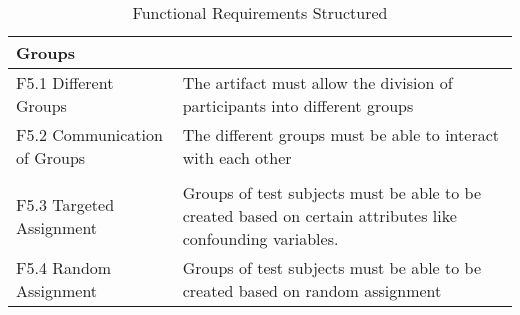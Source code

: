 \begin{table}
\begin{tabular}{L{0.35\textwidth}L{0.59\textwidth}}
    Groups                      &             \\ \hline
    F5.1 Different Groups           & The artifact must allow the division of participants into different groups            \\
    F5.2 Communication of Groups    & The different groups must be able to interact with each other            \\ 
    & \\
    F5.3 Targeted Assignment        & Groups of test subjects must be able to be created based on certain attributes like confounding variables. \\
    F5.4 Random Assignment          & Groups of test subjects must be able to be created based on random assignment \\ \hline
    \end{tabular}
    \caption[Functional Requirements Structured]{Functional Requirements Structured}\label{tab:FuncRequirementsCat}
    \end{table}


